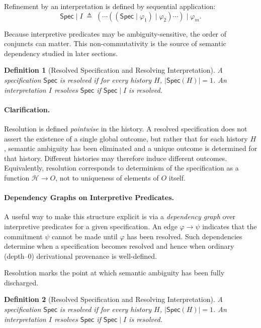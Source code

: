 \documentclass[acmsmall,nonacm]{acmart}
\newtheorem{definition}{Definition}
\theoremstyle{remark}
\numberwithin{definition}{section}
\numberwithin{theorem}{section}
\numberwithin{lemma}{section}
\numberwithin{corollary}{section}
\numberwithin{remark}{section}
\numberwithin{example}{section}
\numberwithin{observation}{section}
\numberwithin{assumption}{section}
\newcommand{\Hist}{\mathcal{H}}
\newcommand{\Spec}{\mathsf{Spec}}
\begin{document}
Refinement by an interpretation is defined by sequential application:
\[
  \Spec \mid I
  \;\triangleq\;
  (\cdots((\Spec \mid \varphi_1)\mid \varphi_2)\cdots)\mid \varphi_m .
\]

Because interpretive predicates may be ambiguity-sensitive, the order of conjuncts
can matter.
This non-commutativity is the source of semantic dependency studied in later
sections.

\begin{definition}[Resolved Specification and Resolving Interpretation]
A specification $\Spec$ is \emph{resolved} if for every history $H$,
$|\Spec(H)| = 1$.
An interpretation $I$ \emph{resolves} $\Spec$ if $\Spec \mid I$ is resolved.
\end{definition}

\paragraph{Clarification.}
Resolution is defined \emph{pointwise} in the history.
A resolved specification does not assert the existence of a single global outcome,
but rather that for each history $H$, semantic ambiguity has been eliminated and a
unique outcome is determined for that history.
Different histories may therefore induce different outcomes.
Equivalently, resolution corresponds to determinism of the specification as a
function $\Hist \to O$, not to uniqueness of elements of $O$ itself.

\paragraph{Dependency Graphs on Interpretive Predicates.}
A useful way to make this structure explicit is via a \emph{dependency graph}
over interpretive predicates for a given specification.
An edge $\varphi \rightarrow \psi$ indicates that the commitment $\psi$ cannot be
made until $\varphi$ has been resolved.
Such dependencies determine when a specification becomes resolved and hence when
ordinary (depth--0) derivational provenance is well-defined. 

Resolution marks the point at which semantic ambiguity has been fully discharged.
\begin{definition}[Resolved Specification and Resolving Interpretation]
A specification $\Spec$ is \emph{resolved} if for every history $H$,
$|\Spec(H)| = 1$.
An interpretation $I$ \emph{resolves} $\Spec$ if $\Spec \mid I$ is resolved.
\end{definition}
\end{document}
